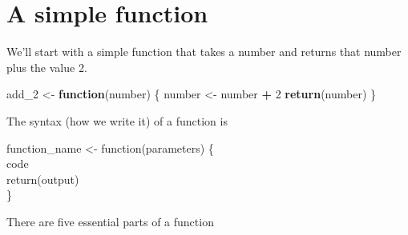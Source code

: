 \documentclass[
  12pt,
]{book}
\newenvironment{Shaded}{\begin{snugshade}}{\end{snugshade}}
\newcommand{\ControlFlowTok}[1]{\textcolor[rgb]{0.13,0.29,0.53}{\textbf{#1}}}
\newcommand{\DecValTok}[1]{\textcolor[rgb]{0.00,0.00,0.81}{#1}}
\newcommand{\KeywordTok}[1]{\textcolor[rgb]{0.13,0.29,0.53}{\textbf{#1}}}
\newcommand{\NormalTok}[1]{#1}
\newcommand{\OperatorTok}[1]{\textcolor[rgb]{0.81,0.36,0.00}{\textbf{#1}}}
\newcommand{\StringTok}[1]{\textcolor[rgb]{0.31,0.60,0.02}{#1}}
\begin{document}
\hypertarget{a-simple-function}{%
\section{A simple function}\label{a-simple-function}}

We'll start with a simple function that takes a number and returns that number plus the value 2.

\begin{Shaded}
\begin{Highlighting}[]
\NormalTok{add\_}\DecValTok{2}\NormalTok{ <{-}}\StringTok{ }\ControlFlowTok{function}\NormalTok{(number) \{}
\NormalTok{  number <{-}}\StringTok{ }\NormalTok{number }\OperatorTok{+}\StringTok{ }\DecValTok{2}
  \KeywordTok{return}\NormalTok{(number)}
\NormalTok{\}}
\end{Highlighting}
\end{Shaded}

The syntax (how we write it) of a function is

function\_name \textless- function(parameters)
\{\\
code\\
return(output)\\
\}

There are five essential parts of a function
\end{document}
